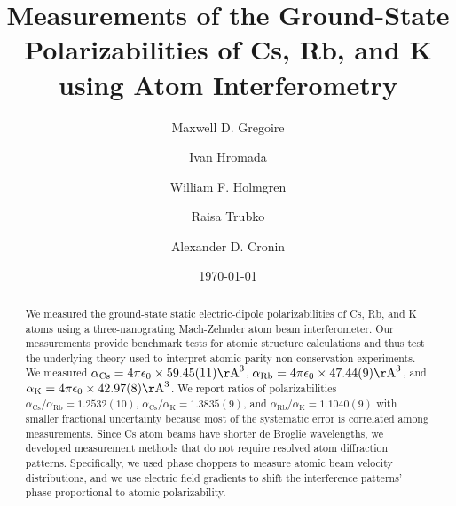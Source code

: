 \documentclass[twocolumn,prl,showpacs,superscriptaddress]{revtex4-1}   %
\newcommand{\ak}{\alpha_{\textrm{K}}}
\newcommand{\arb}{\alpha_{\textrm{Rb}}}
\newcommand{\acs}{\alpha_{\textrm{Cs}}}
\newcommand{\polKSysOnly}{42.97(8)}
\newcommand{\polRbSysOnly}{47.44(9)}
\newcommand{\polCsSysOnly}{59.45(11)}
\newcommand{\ratRbK}{1.1040(9)}
\newcommand{\ratCsK}{1.3835(9)}
\newcommand{\ratCsRb}{1.2532(10)}
\newcommand{\AAA}{\mathrm{\AA}}
\begin{document}
\title{Measurements of the Ground-State Polarizabilities of Cs, Rb, and K using Atom Interferometry}

\author{Maxwell D. Gregoire}
\author{Ivan Hromada}
\author{William F. Holmgren}
\author{Raisa Trubko}
\author{Alexander D. Cronin}

\date{\today}





\begin{abstract}
We measured the ground-state static electric-dipole polarizabilities of Cs, Rb, and K atoms using a three-nanograting Mach-Zehnder atom beam interferometer. Our measurements provide benchmark tests for atomic structure calculations and thus test the underlying theory used to interpret atomic parity non-conservation experiments. We measured $\acs = 4\pi\epsilon_0 \times \polCsSysOnly \AAA^3$, $\arb = 4\pi\epsilon_0 \times \polRbSysOnly \AAA^3$, and $\ak = 4\pi\epsilon_0 \times \polKSysOnly \AAA^3$. We report ratios of polarizabilities $\acs/\arb = \ratCsRb$, $\acs/\ak = \ratCsK$, and $\arb/\ak = \ratRbK$ with smaller fractional uncertainty because most of the systematic error is correlated among measurements. 
Since Cs atom beams have shorter de Broglie wavelengths, we developed measurement methods that do not require resolved atom diffraction patterns.
Specifically, we used phase choppers to measure atomic beam velocity distributions, and we use electric field gradients to shift the interference patterns' phase proportional to atomic polarizability.
\end{abstract}





\maketitle
\end{document}
